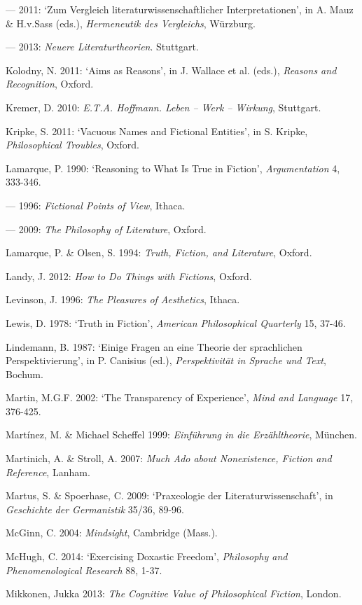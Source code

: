 \begin{hangparas}{.5cm}{1}
--- 2011: `Zum Vergleich literaturwissenschaftlicher Interpretationen', in A. Mauz \& H.v.Sass (eds.), \emph{Hermeneutik des Vergleichs}, W\"urzburg.

--- 2013: \emph{Neuere Literaturtheorien}. Stuttgart.

Kolodny, N. 2011: `Aims as Reasons', in J. Wallace et al. (eds.), \emph{Reasons and Recognition}, Oxford.

Kremer, D. 2010: \emph{E.T.A. Hoffmann. Leben -- Werk -- Wirkung}, Stuttgart.

Kripke, S. 2011: `Vacuous Names and Fictional Entities', in S. Kripke, \emph{Philosophical Troubles}, Oxford.

Lamarque, P. 1990: `Reasoning to What Is True in Fiction', \emph{Argumentation} 4, 333-346.

--- 1996: \emph{Fictional Points of View}, Ithaca. 

--- 2009: \emph{The Philosophy of Literature}, Oxford. 

Lamarque, P. \& Olsen, S. 1994: \emph{Truth, Fiction, and Literature}, Oxford.

Landy, J. 2012: \emph{How to Do Things with Fictions}, Oxford.

Levinson, J. 1996: \emph{The Pleasures of Aesthetics}, Ithaca.

Lewis, D. 1978: `Truth in Fiction', \emph{American Philosophical Quarterly} 15, 37-46.

Lindemann, B. 1987: `Einige Fragen an eine Theorie der sprachlichen Perspektivierung', in P. Canisius (ed.), \emph{Perspektivit\"at in Sprache und Text}, Bochum.

Martin, M.G.F. 2002: `The Transparency of Experience', \emph{Mind and Language} 17, 376-425.

Mart\'inez, M. \& Michael Scheffel 1999: \emph{Einf\"uhrung in die Erz\"ahltheorie}, M\"unchen.

Martinich, A. \& Stroll, A. 2007: \emph{Much Ado about Nonexistence, Fiction and Reference}, Lanham.

Martus, S. \& Spoerhase, C. 2009: `Praxeologie der Literaturwissenschaft', in \emph{Geschichte der Germanistik} 35/36, 89-96.

McGinn, C. 2004: \emph{Mindsight}, Cambridge (Mass.).

McHugh, C. 2014: `Exercising Doxastic Freedom', \emph{Philosophy and Phenomenological Research} 88, 1-37.

Mikkonen, Jukka 2013: \emph{The Cognitive Value of Philosophical Fiction}, London.


\end{hangparas}
